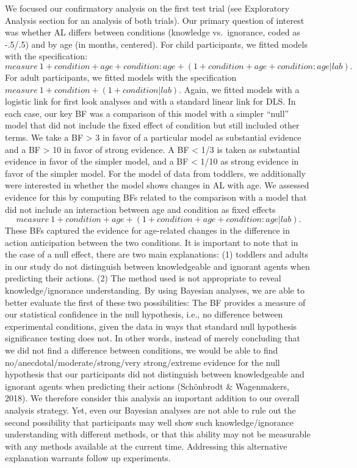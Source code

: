 \documentclass[
  english,
  man,floatsintext]{apa6}
\begin{document}
We focused our confirmatory analysis on the first test trial (see Exploratory Analysis section for an analysis of both trials). Our primary question of interest was whether AL differs between conditions (knowledge vs.~ignorance, coded as -.5/.5) and by age (in months, centered). For child participants, we fitted models with the specification:
\(measure ~ 1 + condition + age + condition:age + (1 + condition + age + condition:age | lab).\)
For adult participants, we fitted models with the specification
\(measure ~ 1 + condition + (1 + condition | lab).\)
Again, we fitted models with a logistic link for first look analyses and with a standard linear link for DLS.
In each case, our key BF was a comparison of this model with a simpler ``null'' model that did not include the fixed effect of condition but still included other terms. We take a BF \textgreater{} 3 in favor of a particular model as substantial evidence and a BF \textgreater{} 10 in favor of strong evidence. A BF \textless{} 1/3 is taken as substantial evidence in favor of the simpler model, and a BF \textless{} 1/10 as strong evidence in favor of the simpler model.
For the model of data from toddlers, we additionally were interested in whether the model shows changes in AL with age. We assessed evidence for this by computing BFs related to the comparison with a model that did not include an interaction between age and condition as fixed effects
\[measure ~ 1 + condition + age + (1 + condition + age + condition:age | lab).\]
These BFs captured the evidence for age-related changes in the difference in action anticipation between the two conditions.
It is important to note that in the case of a null effect, there are two main explanations: (1) toddlers and adults in our study do not distinguish between knowledgeable and ignorant agents when predicting their actions. (2) The method used is not appropriate to reveal knowledge/ignorance understanding. By using Bayesian analyses, we are able to better evaluate the first of these two possibilities: The BF provides a measure of our statistical confidence in the null hypothesis, i.e., no difference between experimental conditions, given the data in ways that standard null hypothesis significance testing does not. In other words, instead of merely concluding that we did not find a difference between conditions, we would be able to find no/anecdotal/moderate/strong/very strong/extreme evidence for the null hypothesis that our participants did not distinguish between knowledgeable and ignorant agents when predicting their actions (Schönbrodt \& Wagenmakers, 2018). We therefore consider this analysis an important addition to our overall analysis strategy. Yet, even our Bayesian analyses are not able to rule out the second possibility that participants may well show such knowledge/ignorance understanding with different methods, or that this ability may not be measurable with any methods available at the current time. Addressing this alternative explanation warrants follow up experiments.
\end{document}

